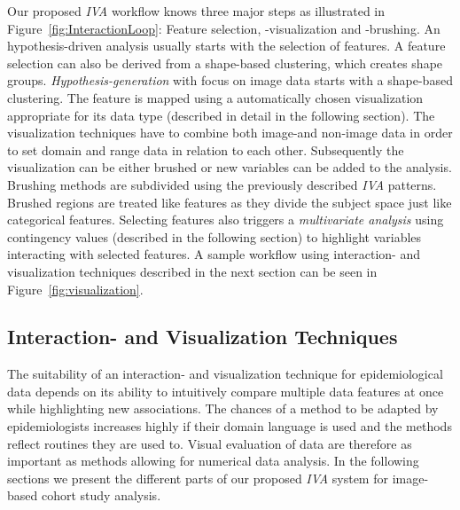 \documentclass[journal]{style/vgtc} 			          %
\begin{document}
Our proposed \emph{IVA} workflow knows three major steps as illustrated in Figure~\ref{fig:InteractionLoop}: Feature selection, -visualization and -brushing.
%
An hypothesis-driven analysis usually starts with the selection of features.
%
A feature selection can also be derived from a shape-based clustering, which creates shape groups.
%
\emph{Hypothesis-generation} with focus on image data starts with a shape-based clustering.
%
The feature is mapped using a automatically chosen visualization appropriate for its data type (described in detail in the following section).
%
The visualization techniques have to combine both image-and non-image data in order to set domain and range data in relation to each other.
%
Subsequently the visualization can be either brushed or new variables can be added to the analysis.
%
Brushing methods are subdivided using the previously described \emph{IVA} patterns.
%
Brushed regions are treated like features as they divide the subject space just like categorical features. %
%
Selecting features also triggers a \emph{multivariate analysis} using contingency values (described in the following section) to highlight variables interacting with selected features.
%
%
%
A sample workflow using interaction- and visualization techniques described in the next section can be seen in Figure~\ref{fig:visualization}.

\subsection{Interaction- and Visualization Techniques} \label{Interaction- and Visualization Techniques}
%
%
The suitability of an interaction- and visualization technique for epidemiological data depends on its ability to intuitively compare multiple data features at once while highlighting new associations.
%
%
The chances of a method to be adapted by epidemiologists increases highly if their domain language is used and the methods reflect routines they are used to.
%
Visual evaluation of data are therefore as important as methods allowing for numerical data analysis.
%
In the following sections we present the different parts of our proposed \emph{IVA} system for image-based cohort study analysis.
\end{document}
